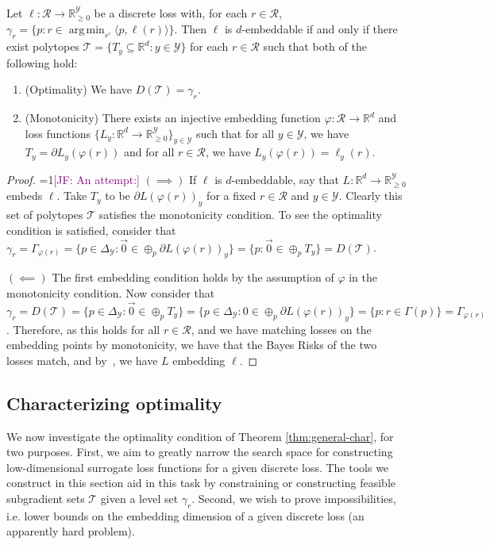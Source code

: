 \documentclass[anon]{colt2020} %
\newcommand{\Comments}{1}
\newcommand{\mynote}[2]{\ifnum\Comments=1\textcolor{#1}{#2}\fi}
\newcommand{\jessie}[1]{\mynote{purple}{[JF: #1]}}
\newcommand{\reals}{\mathbb{R}}
\newcommand{\simplex}{\Delta_\Y}
\newcommand{\R}{\mathcal{R}}
\newcommand{\T}{\mathcal{T}}
\newcommand{\Y}{\mathcal{Y}}
\newcommand{\inprod}[2]{\langle #1, #2 \rangle}%
\DeclareMathOperator*{\argmin}{arg\,min}
\begin{document}
\begin{theorem} \label{thm:general-char}
  Let $\ell: \R \to \reals_{\geq 0}^{\Y}$ be a discrete loss with, for each $r \in \R$, $\gamma_r = \{p : r \in \argmin_{r'} \inprod{p}{\ell(r)}\}$.
  Then $\ell$ is $d$-embeddable if and only if there exist polytopes $\T = \{T_y \subseteq \reals^d : y \in \Y\}$ for each $r \in \R$ such that both of the following hold:
  \begin{enumerate}
    \item (Optimality) We have $D(\T) = \gamma_r$.
    \item (Monotonicity) There exists an injective embedding function $\varphi : \R \to \reals^d$ and loss functions $\{L_y : \reals^d \to \reals^\Y_{\geq 0}\}_{y \in \Y}$ such that for all $y \in \Y$, we have $T_y = \partial L_y(\varphi(r))$ and for all $r \in \R$, we have $L_y(\varphi(r)) = \ell_y(r)$.
  \end{enumerate}
\end{theorem}
\begin{proof}
  \jessie{An attempt:}
  $(\implies)$ If $\ell$ is $d$-embeddable, say that $L:\reals^d \to \reals^\Y_{\geq 0}$ embeds $\ell$.
  Take $T_y$ to be $\partial L(\varphi(r))_y$ for a fixed $r \in \R$ and $y \in \Y$.
  Clearly this set of polytopes $\T$ satisfies the monotonicity condition.
  To see the optimality condition is satisfied, consider that $\gamma_r = \Gamma_{\varphi(r)} = \{p \in \simplex : \vec 0 \in \oplus_p \partial L(\varphi(r))_y \} = \{p : \vec 0 \in \oplus_p T_y \} = D(\T)$.
  
  \bigskip
  $(\impliedby)$ The first embedding condition holds by the assumption of $\varphi$ in the monotonicity condition.
  Now consider that $\gamma_r = D(\T) = \{p \in \simplex : \vec 0 \in \oplus_p T_y \} = \{p \in \simplex : 0 \in \oplus_p \partial L(\varphi(r))_y \} = \{p : r \in \Gamma(p) \} =  \Gamma_{\varphi(r)}$.
  Therefore, as this holds for all $r \in \R$, and we have matching losses on the embedding points by monotonicity, we have that the Bayes Risks of the two losses match, and by~\cite[Proposition 1]{finocchiaro2019embedding}, we have $L$ embedding $\ell$. 
\end{proof}


\subsection{Characterizing optimality}\label{subsec:opt-conditions}

We now investigate the optimality condition of Theorem \ref{thm:general-char}, for two purposes.
First, we aim to greatly narrow the search space for constructing low-dimensional surrogate loss functions for a given discrete loss.
The tools we construct in this section aid in this task by constraining or constructing feasible subgradient sets $\T$ given a level set $\gamma_r$.
Second, we wish to prove impossibilities, i.e. lower bounds on the embedding dimension of a given discrete loss (an apparently hard problem).
\end{document}

